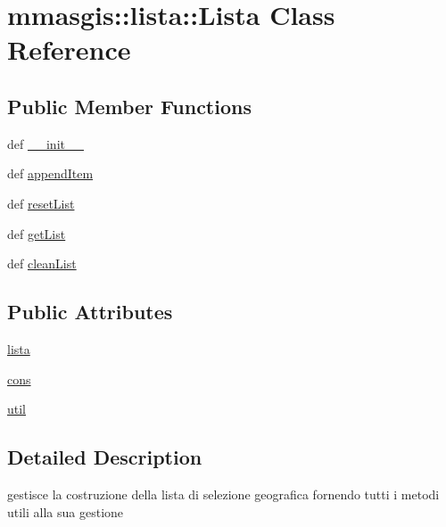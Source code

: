 \hypertarget{classmmasgis_1_1lista_1_1Lista}{
\section{mmasgis::lista::Lista Class Reference}
\label{classmmasgis_1_1lista_1_1Lista}
}
\subsection*{Public Member Functions}
\begin{DoxyCompactItemize}
\item 
def \hyperlink{classmmasgis_1_1lista_1_1Lista_ae0755344c0d29448d3b0203906edd540}{\_\-\_\-init\_\-\_\-}
\item 
def \hyperlink{classmmasgis_1_1lista_1_1Lista_a3280e641b36dc66572d1b59ae2f4f75f}{appendItem}
\item 
def \hyperlink{classmmasgis_1_1lista_1_1Lista_a56e67d969de16fa52cbb70c9c9345009}{resetList}
\item 
def \hyperlink{classmmasgis_1_1lista_1_1Lista_a5d059475387a8d86895fc605a6e98ff1}{getList}
\item 
def \hyperlink{classmmasgis_1_1lista_1_1Lista_aa9d4cdb5f8c4c5da737774b2a96598c8}{cleanList}
\end{DoxyCompactItemize}
\subsection*{Public Attributes}
\begin{DoxyCompactItemize}
\item 
\hyperlink{classmmasgis_1_1lista_1_1Lista_a487c2fb94a024e6a85d93c4dd9697c3d}{lista}
\item 
\hyperlink{classmmasgis_1_1lista_1_1Lista_a869b7f0467c41bf56bf0434d2fab7256}{cons}
\item 
\hyperlink{classmmasgis_1_1lista_1_1Lista_a6debfb85e47d9b1a303d11f0ee0f9c9a}{util}
\end{DoxyCompactItemize}


\subsection{Detailed Description}
\begin{DoxyVerb}
gestisce la costruzione della lista di selezione geografica
fornendo tutti i metodi utili alla sua gestione
\end{DoxyVerb}
 

